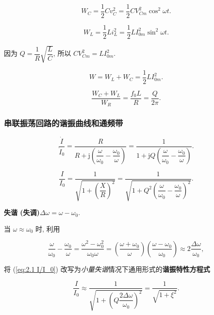 \begin{equation}
    W_C=\frac{1}{2}Cv_C^2=\frac{1}{2}CV_{Cm}^2\cos^2\omega t.
\end{equation}

\begin{equation}
    W_L=\frac{1}{2}Li_L^2=\frac{1}{2}LI_{0m}^2\sin^2\omega t.
\end{equation}

因为 $Q=\dfrac{1}{R}\sqrt{\dfrac{L}{C}}$, 所以 $CV_{Cm}^2=LI_{0m}^2$.

\begin{equation}
    W=W_L+W_C=\frac{1}{2}LI_{0m}^2.
\end{equation}

\begin{equation}
    \frac{W_C+W_L}{W_R}=\frac{f_0L}{R}=\frac{Q}{2\pi}.
\end{equation}

\subsubsection{串联振荡回路的谐振曲线和通频带} \label{串联振荡回路的谐振曲线和通频带}

\begin{equation}
    \frac{\dot{I}}{\dot{I}_0}=\frac{R}{R+\mathrm{j}\left(\dfrac{\omega}{\omega_0}-\dfrac{\omega_0}{\omega}\right)}=\frac{1}{1+\mathrm{j}Q\left(\dfrac{\omega}{\omega_0}-\dfrac{\omega_0}{\omega}\right)}.
\end{equation}

\begin{equation} \label{eq:2.1 I/I_0}
    \frac{I}{I_0}=\frac{1}{\sqrt{1+\left(\dfrac{X}{R}\right)^2}}=\frac{1}{\sqrt{1+Q^2\left(\dfrac{\omega}{\omega_0}-\dfrac{\omega_0}{\omega}\right)^2}}.
\end{equation}

\textbf{失谐 (失调)}\quad $\Delta\omega=\omega-\omega_0$.

当 $\omega\approx\omega_0$ 时, 利用

\begin{equation*}
    \frac{\omega}{\omega_0}-\frac{\omega_0}{\omega}=\frac{\omega^2-\omega_0^2}{\omega_0\omega}=\left(\frac{\omega+\omega_0}{\omega}\right)\left(\frac{\omega-\omega_0}{\omega_0}\right)\approx 2\frac{\Delta\omega}{\omega_0},
\end{equation*}

\noindent 将 (\ref{eq:2.1 I/I_0}) 改写为\textit{小量失谐}情况下通用形式的\textbf{谐振特性方程式}

\begin{equation} \label{eq:2.1 I/I_0 xi}
    \frac{I}{I_0}\approx\frac{1}{\sqrt{1+\left(Q\dfrac{2\Delta\omega}{\omega_0}\right)^2}}=\frac{1}{\sqrt{1+\xi^2}}.
\end{equation}

